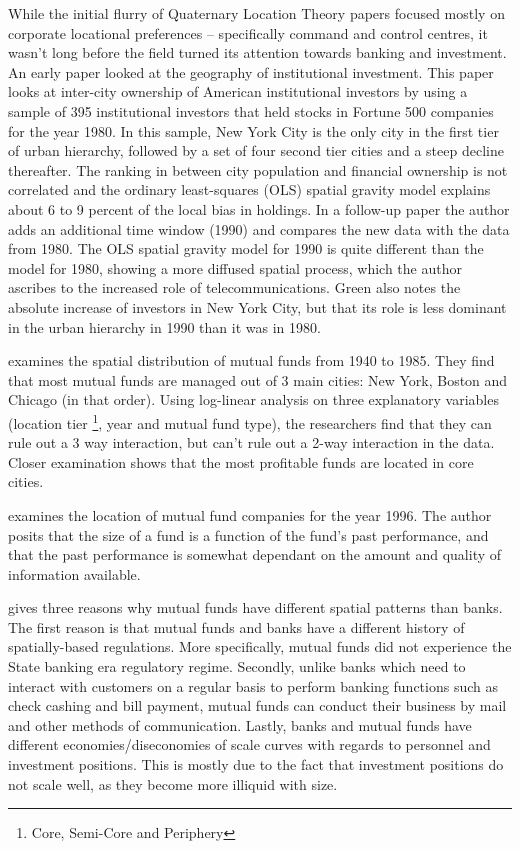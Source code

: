 While the initial flurry of Quaternary Location Theory papers focused mostly on corporate locational preferences -- specifically command and control centres, it wasn't long before the field turned its attention towards banking and investment. An early paper \citep{greena1993} looked at the geography of institutional investment.  This paper looks at inter-city ownership of American institutional investors by using a sample of 395 institutional investors that held stocks in Fortune 500 companies for the year 1980.  In this sample, New York City is the only city in the first tier of urban hierarchy, followed by a set of four second tier cities and a steep decline thereafter.  The ranking in between city population and financial ownership is not correlated and the ordinary least-squares (OLS) spatial gravity model explains about 6 to 9 percent of the local bias in holdings.  In a follow-up paper \citep{Green1995} the author adds an additional time window (1990) and compares the new data with the data from 1980.  The OLS spatial gravity model for 1990 is quite different than the model for 1980, showing a more diffused spatial process, which the author ascribes to the increased role of telecommunications.  Green also notes the absolute increase of investors in New York City, but that its role is less dominant in the urban hierarchy in 1990 than it was in 1980.  
	
\cite{GreenMeyer1996} examines the spatial distribution of mutual funds from 1940 to 1985.  They find that most mutual funds are managed out of 3 main cities: New York, Boston and Chicago (in that order).  Using log-linear analysis on three explanatory variables (location  tier \footnote{Core, Semi-Core and Periphery}, year and mutual fund type), the researchers find that they can rule out a 3 way interaction, but can't rule out a 2-way interaction in the data.  Closer examination shows that the most profitable funds are located in core cities.  
	
\cite{gravesthe1998} examines the location of mutual fund companies for the year 1996. The author posits that the size of a fund is a function of the fund's past performance, and that the past performance is somewhat dependant on the amount and quality of information available. 
	
\cite{gravesthe1998} gives three reasons why mutual funds have different spatial patterns than banks.  The first reason is that mutual funds and banks have a different history of spatially-based regulations.  More specifically, mutual funds did not experience the State banking era regulatory regime.  Secondly, unlike banks which need to interact with customers on a regular basis to perform banking functions such as check cashing and bill payment, mutual funds can conduct their business by mail and other methods of communication.  Lastly, banks and mutual funds have different economies/diseconomies of scale curves with regards to personnel and investment positions.  This is mostly due to the fact that investment positions do not scale well, as they become more illiquid with size.  
	
